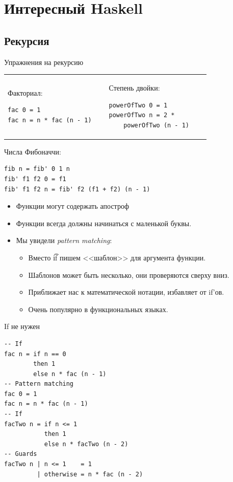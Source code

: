 \section{Интересный Haskell}
\subsection{Рекурсия}

\begin{frame}
\end{frame}

\begin{frame}[t,fragile]{Упражнения на рекурсию}
	\begin{tabular}{p{0.45\linewidth}p{0.45\linewidth}}
	\centering
	Факториал:
\begin{verbatim}
fac 0 = 1
fac n = n * fac (n - 1)
\end{verbatim}
	&
	Степень двойки: \pause
\begin{verbatim}
powerOfTwo 0 = 1
powerOfTwo n = 2 *
    powerOfTwo (n - 1)
\end{verbatim}
	\end{tabular}
	\vspace{-10pt}

	Числа Фибоначчи: \pause
\begin{verbatim}
fib n = fib' 0 1 n
fib' f1 f2 0 = f1
fib' f1 f2 n = fib' f2 (f1 + f2) (n - 1)
\end{verbatim}
	\begin{itemize}
		\item Функции могут содержать апостроф
		\item Функции всегда должны начинаться с маленькой буквы.
		\item Мы увидели \textit{pattern matching}:
			\begin{itemize}
				\item Вместо \t{if} пишем <<шаблон>> для аргумента функции.
				\item Шаблонов может быть несколько, они проверяются сверху вниз.
				\item Приближает нас к математической нотации, избавляет от if'ов.
				\item Очень популярно в функциональных языках.
			\end{itemize}
	\end{itemize}
\end{frame}

\begin{frame}[fragile]{If не нужен}
\begin{verbatim}
-- If
fac n = if n == 0
        then 1
        else n * fac (n - 1)
-- Pattern matching
fac 0 = 1
fac n = n * fac (n - 1)
-- If
facTwo n = if n <= 1
           then 1
           else n * facTwo (n - 2)
-- Guards
facTwo n | n <= 1    = 1
         | otherwise = n * fac (n - 2)
\end{verbatim}
\end{frame}


